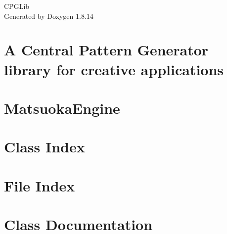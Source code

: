\documentclass[twoside]{book}
\newcommand{\+}{\discretionary{\mbox{\scriptsize$\hookleftarrow$}}{}{}}
\newcommand{\clearemptydoublepage}{%
  \newpage{\pagestyle{empty}\cleardoublepage}%
}
\begin{document}
\hypersetup{pageanchor=false,
             bookmarksnumbered=true,
             pdfencoding=unicode
            }
\begin{titlepage}
\vspace*{7cm}
\begin{center}%
{\Large C\+P\+G\+Lib }\\
\vspace*{1cm}
{\large Generated by Doxygen 1.8.14}\\
\end{center}
\end{titlepage}
\clearemptydoublepage
{}
\tableofcontents
\clearemptydoublepage
{}
\hypersetup{pageanchor=true}

\chapter{A Central Pattern Generator library for creative applications}
\label{index}\hypertarget{index}{}
\chapter{Matsuoka\+Engine}
\label{md_O_1_Documents_Max_7_Packages_max_cpg_source_MatsuokaEngine_src_ReadMe}

\chapter{Class Index}

\chapter{File Index}

\chapter{Class Documentation}
















\end{document}
